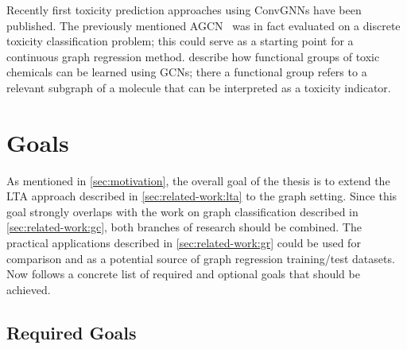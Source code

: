 \documentclass[12pt]{scrartcl}
\begin{document}
Recently first toxicity prediction approaches using ConvGNNs have been published.
The previously mentioned AGCN~\cite{Li2018} was in fact evaluated on a discrete toxicity classification problem;
this could serve as a starting point for a continuous graph regression method.
\citet{Pope2018} describe how functional groups of toxic chemicals can be learned using GCNs;
there a functional group refers to a relevant subgraph of a molecule that can be interpreted as a toxicity indicator.

\section{Goals}%
\label{sec:goals}

As mentioned in \cref{sec:motivation}, the overall goal of the thesis is to extend the LTA approach described in \cref{sec:related-work:lta} to the graph setting.
Since this goal strongly overlaps with the work on graph classification described in \cref{sec:related-work:gc}, both branches of research should be combined.
The practical applications described in \cref{sec:related-work:gr} could be used for comparison and as a potential source of graph regression training/test datasets.
Now follows a concrete list of required and optional goals that should be achieved.

\subsection{Required Goals}%
\label{sec:goals:req}
\end{document}
